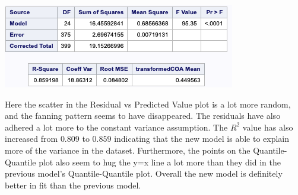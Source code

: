 \documentclass{article}
\begin{document}
\includegraphics[scale=1]{diagnosticStats.png}

Here the scatter in the Residual vs Predicted Value plot is a lot more random, and the fanning pattern seems to have disappeared. The residuals have also adhered a lot more to the constant variance assumption. The $R^2$ value has also increased from $0.809$ to $0.859$ indicating that the new model is able to explain more of the variance in the dataset. Furthermore, the points on the Quantile-Quantile plot also seem to hug the y=x line a lot more than they did in the previous model's Quantile-Quantile plot. Overall the new model is definitely better in fit than the previous model.
\end{document}
